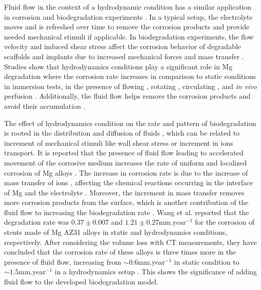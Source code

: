 Fluid flow in the context of a hydrodynamic condition has a similar application in corrosion and biodegradation experiments \cite{Wang2014}. In a typical setup, the electrolyte moves and is refreshed over time to remove the corrosion products and provide needed mechanical stimuli if applicable. In biodegradation experiments, the flow velocity and induced shear stress affect the corrosion behavior of degradable scaffolds and implants due to increased mechanical forces and mass transfer \cite{Wang2014}. Studies show that hydrodynamics conditions play a significant role in Mg degradation \cite{Levesque2008} where the corrosion rate increases in comparison to static conditions in immersion tests, in the presence of flowing \cite{Li2012}, rotating \cite{Jafarzadeh2009}, circulating \cite{Chen2010}, and \textit{in vivo} perfusion \cite{Witte2013}. Additionally, the fluid flow helps remove the corrosion products and avoid their accumulation \cite{Hiromoto2008}.


The effect of hydrodynamics condition on the rate and pattern of biodegradation is rooted in the distribution and diffusion of fluids \cite{Efird2011}, which can be related to increment of mechanical stimuli like wall shear stress or increment in ions transport. It is reported that the presence of fluid flow leading to accelerated movement of the corrosive medium increases the rate of uniform and localized corrosion of Mg alloys \cite{Wang2014}. The increase in corrosion rate is due to the increase of mass transfer of ions \cite{Efird2011}, affecting the chemical reactions occurring in the interface of Mg and the electrolyte \cite{Hiromoto2008,Xu2009}. Moreover, the increment in mass transfer removes more corrosion products from the surface, which is another contribution of the fluid flow to increasing the biodegradation rate \cite{Efird2011}. Wang et al. \cite{Wang2014} reported that the degradation rate was $0.37\pm0.007$ and $1.21\pm0.27 \text{mm.year}^{-1}$ for the corrosion of stents made of Mg AZ31 alloys in static and hydrodynamics conditions, respectively. After considering the volume loss with \gls{CT} measurements, they have concluded that the corrosion rate of these alloys is three times more in the presence of fluid flow, increasing from $\sim 0.6\text{mm.year}^{-1}$ in static condition to $\sim 1.5\text{mm.year}^{-1}$ in a hydrodynamics setup \cite{Wang2014}. This shows the significance of adding fluid flow to the developed biodegradation model.

